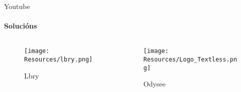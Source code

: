 \documentclass{beamer}
\begin{document}

\begin{frame}{Youtube}
  \framesubtitle{Solucións}

  \begin{columns}

    \begin{column}{0.5\textwidth}

      \begin{figure}

        \texttt{[image: Resources/lbry.png]}
        \caption{Lbry}
        \label{Lbry}

      \end{figure}

      \vspace{0.4cm}

      \hspace{40pt} %

    \end{column}


    \begin{column}{0.5\textwidth}

      \begin{figure}

        \texttt{[image: Resources/Logo\_Textless.png]}
        \caption{Odysee}
        \label{Odysee}

      \end{figure}

      \vspace{0.5cm}

      \hspace{40pt} %

    \end{column}

  \end{columns}

\end{frame}


\end{document}
